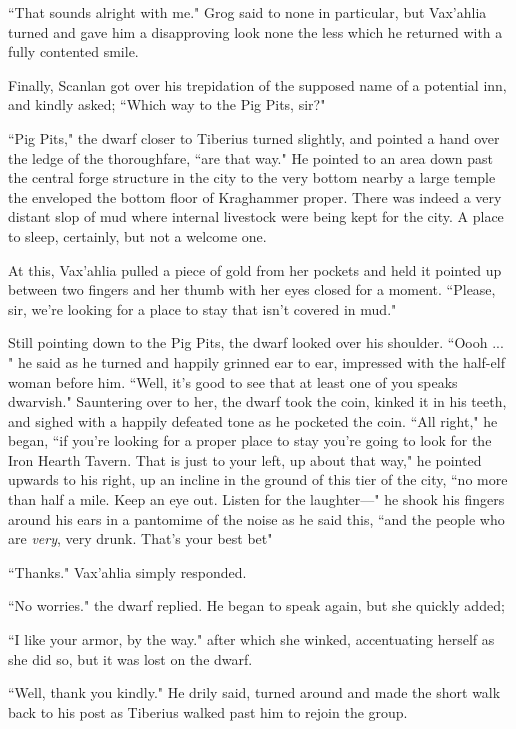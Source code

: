 ``That sounds alright with me." Grog said to none in particular, but Vax'ahlia turned and gave him a disapproving look none the less which he returned with a fully contented smile.

Finally, Scanlan got over his trepidation of the supposed name of a potential inn, and kindly asked; ``Which way to the Pig Pits, sir?"

``Pig Pits," the dwarf closer to Tiberius turned slightly, and pointed a hand over the ledge of the thoroughfare, ``are that way." He pointed to an area down past the central forge structure in the city to the very bottom nearby a large temple the enveloped the bottom floor of Kraghammer proper. There was indeed a very distant slop of mud where internal livestock were being kept for the city. A place to sleep, certainly, but not a welcome one.

At this, Vax'ahlia pulled a piece of gold from her pockets and held it pointed up between two fingers and her thumb with her eyes closed for a moment. ``Please, sir, we're looking for a place to stay that isn't covered in mud."

Still pointing down to the Pig Pits, the dwarf looked over his shoulder. ``Oooh ... " he said as he turned and happily grinned ear to ear, impressed with the half-elf woman before him. ``Well, it's good to see that at least one of you speaks dwarvish." Sauntering over to her, the dwarf took the coin, kinked it in his teeth, and sighed with a happily defeated tone as he pocketed the coin. ``All right," he began, ``if you're looking for a proper place to stay you're going to look for the Iron Hearth Tavern. That is just to your left, up about that way," he pointed upwards to his right, up an incline in the ground of this tier of the city, ``no more than half a mile. Keep an eye out. Listen for the laughter---" he shook his fingers around his ears in a pantomime of the noise as he said this, ``and the people who are \textit{very}, very drunk. That's your best bet"

``Thanks." Vax'ahlia simply responded.

``No worries." the dwarf replied. He began to speak again, but she quickly added;

``I like your armor, by the way." after which she winked, accentuating herself as she did so, but it was lost on the dwarf.

``Well, thank you kindly." He drily said, turned around and made the short walk back to his post as Tiberius walked past him to rejoin the group.

\newpage

